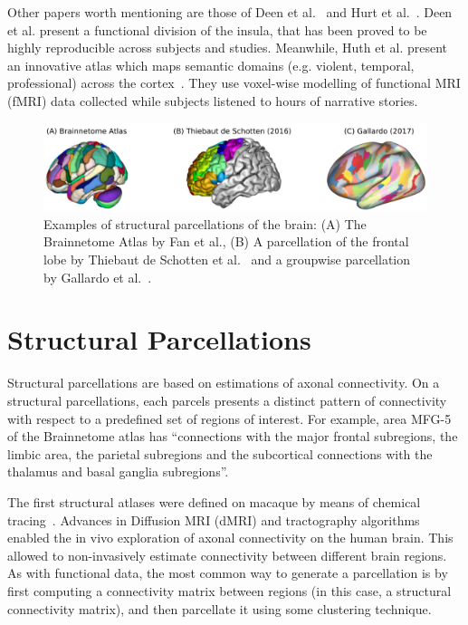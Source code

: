 Other papers worth mentioning are those of Deen et al.~\cite{Deen2011} and Hurt
et al.~\cite{Huth2016}. Deen et al. present a functional division
of the insula, that has been proved to be highly reproducible across subjects
and studies. Meanwhile, Huth et al. present an innovative atlas which maps semantic
domains (e.g. violent, temporal, professional) across the cortex~\cite{Huth2016}.
They use voxel-wise modelling of functional MRI (fMRI) data collected while 
subjects listened to hours of narrative stories.

\begin{figure}[t]
    \includegraphics[width=\textwidth]{4.brain_parcellation/img/structural.png}
    \caption{Examples of structural parcellations of the brain: (A) The Brainnetome
             Atlas by Fan et al.\cite{Fan2016}, (B) A parcellation of the
             frontal lobe by Thiebaut de Schotten et al.~\cite{ThiebautdeSchotten2016} and
             a groupwise parcellation by Gallardo et al.~\cite{Gallardo2017a}.}
    \label{fig:brain_function}
\end{figure}

\section{Structural Parcellations}
\label{sec:structural}
Structural parcellations are based on estimations of axonal connectivity. On
a structural parcellations, each parcels presents a distinct pattern of
connectivity with respect to a predefined set of regions of interest. For example,
area MFG-5 of the Brainnetome atlas has ``connections 
with the major frontal subregions, the limbic area, the parietal subregions
and the subcortical connections with the thalamus and basal ganglia subregions''\cite{Fan2016}.

The first structural atlases were defined on macaque by means of chemical tracing~\cite{Stephan2013}.
Advances in Diffusion MRI (dMRI) and tractography algorithms enabled the in vivo
exploration of axonal connectivity on the human brain. This allowed to non-invasively
estimate connectivity between different brain regions. As with functional data,
the most common way to generate a parcellation is by first computing a connectivity matrix
between regions (in this case, a structural connectivity matrix), and then parcellate it using
some clustering technique.

